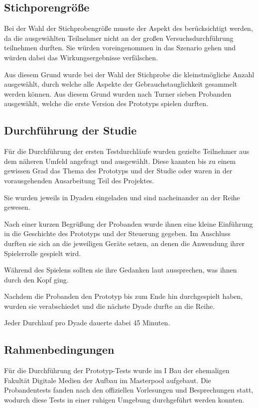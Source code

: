 \subsection{Stichporengröße}\label{sec:pre-study-sample}
Bei der Wahl der Stichprobengröße musste der Aspekt des  berücksichtigt werden, da die ausgewählten Teilnehmer nicht an der großen Versuchsdurchführung teilnehmen durften. Sie würden voreingenommen in das Szenario gehen und würden dabei das Wirkungsergebnisse verfälschen.

Aus diesem Grund wurde bei der Wahl der Stichprobe die kleinstmögliche Anzahl ausgewählt, durch welche alle Aspekte der Gebrauchstauglichkeit gesammelt werden können. Aus diesem Grund wurden nach Turner \cite[S. 3088]{turner_determining_2006} sieben Probanden ausgewählt, welche die erste Version des Prototyps spielen durften.

\subsection{Durchführung der Studie}
Für die Durchführung der ersten Testdurchläufe wurden gezielte Teilnehmer aus dem näheren Umfeld angefragt und ausgewählt. Diese kannten bis zu einem gewissen Grad das Thema des Prototyps und der Studie oder waren in der vorausgehenden Ausarbeitung Teil des Projektes.

Sie wurden jeweils in Dyaden eingeladen und sind nacheinander an der Reihe gewesen.

Nach einer kurzen Begrüßung der Probanden wurde ihnen eine kleine Einführung in die Geschichte des Prototyps und der Steuerung gegeben. Im Anschluss durften sie sich an die jeweiligen Geräte setzen, an denen die Anwendung ihrer Spielerrolle gespielt wird.

Während des Spielens sollten sie ihre Gedanken laut aussprechen, was ihnen durch den Kopf ging. 

Nachdem die Probanden den Prototyp bis zum Ende hin durchgespielt haben, wurden sie verabschiedet und die nächste Dyade durfte an die Reihe.

Jeder Durchlauf pro Dyade dauerte dabei 45 Minuten.

\subsection{Rahmenbedingungen}\label{sec:pre-study-rahmen}
Für die Durchführung der Prototyp-Tests wurde im I Bau der ehemaligen Fakultät Digitale Medien der Aufbau im Masterpool aufgebaut. Die Probandentests fanden nach den offiziellen Vorlesungen und Besprechungen statt, wodurch diese Tests in einer ruhigen Umgebung durchgeführt werden konnten.

